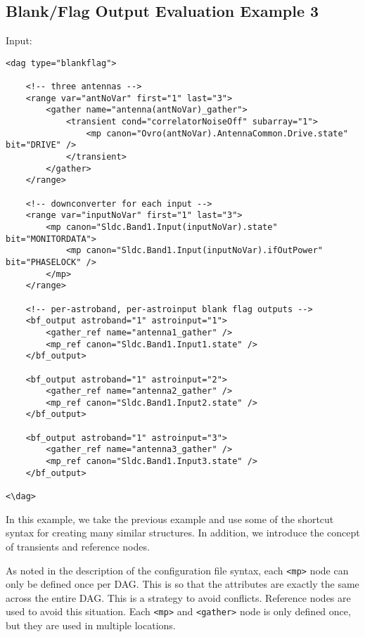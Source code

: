 \documentclass[letterpaper,12pt,oneside,pdftex]{article}
\begin{document}
\subsection{Blank/Flag Output Evaluation Example 3}

\begin{minipage}{\textwidth}
Input: \\
\begin{scriptsize}
\begin{verbatim}
<dag type="blankflag">

    <!-- three antennas -->
    <range var="antNoVar" first="1" last="3">
        <gather name="antenna(antNoVar)_gather">
            <transient cond="correlatorNoiseOff" subarray="1">
                <mp canon="Ovro(antNoVar).AntennaCommon.Drive.state" bit="DRIVE" />
            </transient>
        </gather>
    </range>

    <!-- downconverter for each input -->
    <range var="inputNoVar" first="1" last="3">
        <mp canon="Sldc.Band1.Input(inputNoVar).state" bit="MONITORDATA">
            <mp canon="Sldc.Band1.Input(inputNoVar).ifOutPower" bit="PHASELOCK" />
        </mp>
    </range>

    <!-- per-astroband, per-astroinput blank flag outputs -->
    <bf_output astroband="1" astroinput="1">
        <gather_ref name="antenna1_gather" />
        <mp_ref canon="Sldc.Band1.Input1.state" />
    </bf_output>

    <bf_output astroband="1" astroinput="2">
        <gather_ref name="antenna2_gather" />
        <mp_ref canon="Sldc.Band1.Input2.state" />
    </bf_output>

    <bf_output astroband="1" astroinput="3">
        <gather_ref name="antenna3_gather" />
        <mp_ref canon="Sldc.Band1.Input3.state" />
    </bf_output>

<\dag>
\end{verbatim}
\end{scriptsize}
\end{minipage}

In this example, we take the previous example and use some of the shortcut
syntax for creating many similar structures. In addition, we introduce the
concept of transients and reference nodes.

As noted in the description of the configuration file syntax, each \verb|<mp>|
node can only be defined once per DAG. This is so that the attributes are
exactly the same across the entire DAG. This is a strategy to avoid
conflicts. Reference nodes are used to avoid this situation. Each \verb|<mp>|
and \verb|<gather>| node is only defined once, but they are used in multiple
locations.
\end{document}
